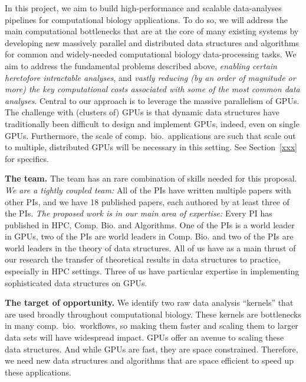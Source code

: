 %

In this project, we aim to build high-performance and scalable data-analyses pipelines for computational biology applications.  To do so, we will address the main computational bottlenecks that are at the core of many existing systems by developing new massively parallel and distributed data structures and algorithms for common and widely-needed computational biology data-processing tasks. We aim to address the fundamental problems described above, \emph{enabling certain heretofore intractable analyses}, and \emph{vastly reducing (by an order of magnitude or more) the key computational costs associated with some of the most common data analyses}. 
%
Central to our approach is to leverage the massive parallelism of GPUs. The challenge with (clusters of) GPUs  is that dynamic data structures have traditionally  been difficult to design and implement GPUs, indeed, even on single GPUs. 
Furthermore, the scale of comp.~bio.~applications are such that scale out to multiple, distributed GPUs will be necessary in this setting.
See Section~\ref{xxx} for specifics.  


\noindent\textbf{The team.} The team has an rare combination of skills needed for this proposal.  \emph{We are a tightly coupled team:}  All of the PIs have written multiple papers with other PIs, and we have 18 published papers, each authored by at least three  of the PIs.
\emph{The proposed work is in our main area of expertise:} Every PI has published in HPC, Comp. Bio. and Algorithms.  One of the PIs is a world leader in GPUs, two of the PIs are world leaders in Comp. Bio. and two  of the PIs are world leaders in the theory of data structures.  All of us have as a main thrust of our research the transfer of theoretical results in data structures to practice, especially in HPC settings.  Three of us have particular expertise in implementing sophisticated data structures on GPUs.

\noindent\textbf{The target of opportunity.}
We identify two raw data analysis ``kernels''
that are used broadly throughout computational biology.  These kernels are bottlenecks in many comp.~bio.~workflows, so making them faster and scaling them to larger data sets will have widespread impact. GPUs offer an avenue to scaling these data structures.  And while 
GPUs are fast, they are space constrained.  Therefore, we need new data structures and algorithms that are space efficient to speed up these applications.  

